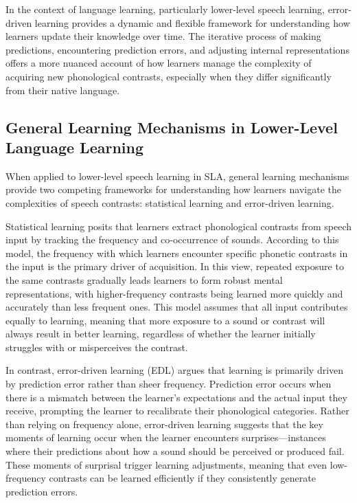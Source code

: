 In the context of language learning, particularly lower-level speech learning, error-driven learning provides a dynamic and flexible framework for understanding how learners update their knowledge over time. The iterative process of making predictions, encountering prediction errors, and adjusting internal representations offers a more nuanced account of how learners manage the complexity of acquiring new phonological contrasts, especially when they differ significantly from their native language.


\subsection{General Learning Mechanisms in Lower-Level Language Learning}

When applied to lower-level speech learning in SLA, general learning mechanisms provide two competing frameworks for understanding how learners navigate the complexities of speech contrasts: statistical learning and error-driven learning.

Statistical learning posits that learners extract phonological contrasts from speech input by tracking the frequency and co-occurrence of sounds. According to this model, the frequency with which learners encounter specific phonetic contrasts in the input is the primary driver of acquisition. In this view, repeated exposure to the same contrasts gradually leads learners to form robust mental representations, with higher-frequency contrasts being learned more quickly and accurately than less frequent ones. This model assumes that all input contributes equally to learning, meaning that more exposure to a sound or contrast will always result in better learning, regardless of whether the learner initially struggles with or misperceives the contrast.

In contrast, error-driven learning (EDL) argues that learning is primarily driven by prediction error rather than sheer frequency. Prediction error occurs when there is a mismatch between the learner's expectations and the actual input they receive, prompting the learner to recalibrate their phonological categories. Rather than relying on frequency alone, error-driven learning suggests that the key moments of learning occur when the learner encounters surprises—instances where their predictions about how a sound should be perceived or produced fail. These moments of surprisal trigger learning adjustments, meaning that even low-frequency contrasts can be learned efficiently if they consistently generate prediction errors.

